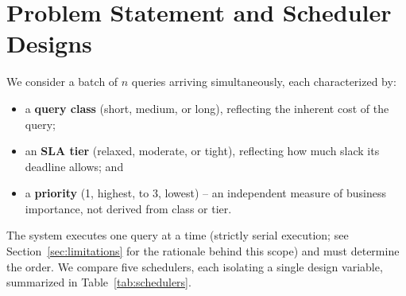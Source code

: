 \documentclass[conference]{IEEEtran}
\begin{document}
\section{Problem Statement and Scheduler Designs}
\label{sec:problem}

We consider a batch of $n$ queries arriving simultaneously, each characterized by:

\begin{itemize}
\item a \textbf{query class} (short, medium, or long), reflecting the inherent cost of the query;
\item an \textbf{SLA tier} (relaxed, moderate, or tight), reflecting how much slack its deadline allows; and
\item a \textbf{priority} (1, highest, to 3, lowest) -- an independent measure of business importance, not derived from class or tier.
\end{itemize}

The system executes one query at a time (strictly serial execution; see Section~\ref{sec:limitations} for the rationale behind this scope) and must determine the order. We compare five schedulers, each isolating a single design variable, summarized in Table~\ref{tab:schedulers}.
\end{document}
